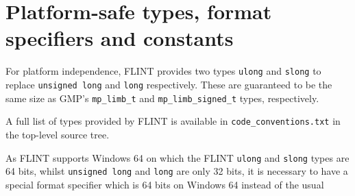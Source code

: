 \documentclass[a4paper,10pt]{book}
\newcommand{\code}{\lstinline}
\begin{document}
\chapter{Platform-safe types, format specifiers and constants}

For platform independence, FLINT provides two types \code{ulong}
and \code{slong} to replace \code{unsigned long} and \code{long}
respectively. These are guaranteed to be the same size as GMP's
\code{mp_limb_t} and \code{mp_limb_signed_t} types, respectively.

A full list of types provided by FLINT is available in
\code{code_conventions.txt} in the top-level source tree.

As FLINT supports Windows 64 on which the FLINT \code{ulong} and
\code{slong} types are 64 bits, whilst \code{unsigned long} and
\code{long} are only 32 bits, it is necessary to have a special
format specifier which is 64 bits on Windows 64 instead of the usual
\end{document}
